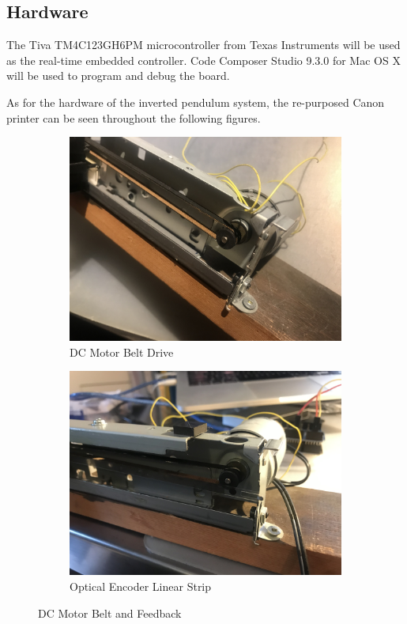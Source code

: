 \documentclass[12pt]{article}
\begin{document}
\subsection{Hardware}
The Tiva TM4C123GH6PM microcontroller from Texas Instruments will be used as the real-time embedded controller. Code Composer Studio 9.3.0 for Mac OS X will be used to program and debug the board.\\ \par
As for the hardware of the inverted pendulum system, the re-purposed Canon printer can be seen throughout the following figures.

\begin{figure}[H]
\centering
\begin{subfigure}{.5\textwidth}
  \centering
  \includegraphics[width=1\linewidth]{figures/IMG_5674.jpg}
  \caption{DC Motor Belt Drive}
  \label{fig:dc}
\end{subfigure}%
\begin{subfigure}{.5\textwidth}
  \centering
  \includegraphics[width=1\linewidth]{figures/IMG_5807.jpg}
  \caption{Optical Encoder Linear Strip}
  \label{fig:opt}
\end{subfigure}
\caption{DC Motor Belt and Feedback}
\end{figure}
\end{document}
